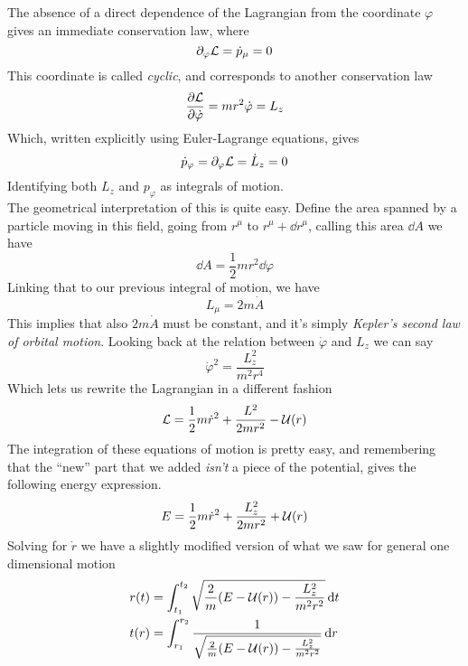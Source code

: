 \documentclass[../admech.tex]{subfiles}
\begin{document}
The absence of a direct dependence of the Lagrangian from the coordinate $\varphi$ gives an immediate conservation law, where
\begin{equation*}
	\partial_\varphi\mathcal{L}=\dot{p}_\mu=0
\end{equation*}
This coordinate is called \emph{cyclic}, and corresponds to another conservation law
\begin{equation*}
	\pdv{\mathcal{L}}{\dot{\varphi}}=mr^2\dot{\varphi}=L_z
\end{equation*}
Which, written explicitly using Euler-Lagrange equations, gives
\begin{equation*}
	\dot{p}_\varphi=\partial_\varphi\mathcal{L}=\dot{L}_z=0
\end{equation*}
Identifying both $L_z$ and $p_\varphi$ as integrals of motion.\\
The geometrical interpretation of this is quite easy. Define the area spanned by a particle moving in this field, going from $r^\mu$ to $r^\mu+\dd{r^\mu}$, calling this area $\dd{A}$ we have
\begin{equation}
	\dd{A}=\frac{1}{2}mr^2\dd{\varphi}
	\label{eq:infareacpot}
\end{equation}
Linking that to our previous integral of motion, we have
\begin{equation}
	L_\mu=2m\dot{A}
	\label{eq:angmomareacpot}
\end{equation}
This implies that also $2m\dot{A}$ must be constant, and it's simply \emph{Kepler's second law of orbital motion}. Looking back at the relation between $\dot{\varphi}$ and $L_z$ we can say
\begin{equation}
	\dot{\varphi}^2=\frac{L_z^2}{m^2r^4}
	\label{eq:philzcpot}
\end{equation}
Which lets us rewrite the Lagrangian in a different fashion
\begin{equation}
	\mathcal{L}=\frac{1}{2}m\dot{r}^2+\frac{L^2}{2mr^2}-\mathcal{U}(r)
	\label{eq:effpotlag}
\end{equation}
The integration of these equations of motion is pretty easy, and remembering that the ``new'' part that we added \emph{isn't} a piece of the potential, gives the following energy expression.
\begin{equation}
	E=\frac{1}{2}m\dot{r}^2+\frac{L_z^2}{2mr^2}+\mathcal{U}(r)
	\label{eq:energycpot}
\end{equation}
Solving for $\dot{r}$ we have a slightly modified version of what we saw for general one dimensional motion
\begin{equation}
	\begin{aligned}
		r(t)&=\int_{t_1}^{t_2}\sqrt{\frac{2}{m}(E-\mathcal{U}(r))-\frac{L_z^2}{m^2r^2}}\dd{t}\\
		t(r)&=\int_{r_1}^{r_2}\frac{1}{\sqrt{\frac{2}{m}(E-\mathcal{U}(r))-\frac{L_z^2}{m^2r^2}}}\dd{r}
	\end{aligned}
	\label{eq:rttrcpot}
\end{equation}
\end{document}
